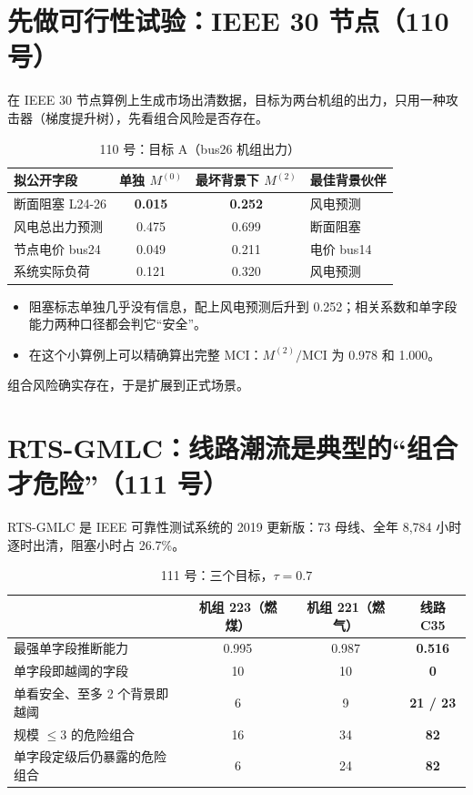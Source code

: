 \documentclass[zihao=-4,a4paper]{ctexart}
\begin{document}
\section{先做可行性试验：IEEE 30 节点（110 号）}

在 IEEE 30 节点算例上生成市场出清数据，目标为两台机组的出力，只用一种攻击器（梯度提升树），先看组合风险是否存在。

\begin{table}[H]\centering
\caption{110 号：目标 A（bus26 机组出力）}
\small
\begin{tabular}{lccl}
\toprule
拟公开字段 & 单独 $M^{(0)}$ & 最坏背景下 $M^{(2)}$ & 最佳背景伙伴 \\
\midrule
断面阻塞 L24-26 & \textbf{0.015} & \textbf{0.252} & 风电预测 \\
风电总出力预测 & 0.475 & 0.699 & 断面阻塞 \\
节点电价 bus24 & 0.049 & 0.211 & 电价 bus14 \\
系统实际负荷 & 0.121 & 0.320 & 风电预测 \\
\bottomrule
\end{tabular}
\end{table}

\begin{itemize}[leftmargin=*]
  \item 阻塞标志单独几乎没有信息，配上风电预测后升到 0.252；相关系数和单字段能力两种口径都会判它“安全”。
  \item 在这个小算例上可以精确算出完整 MCI：$M^{(2)}/\text{MCI}$ 为 0.978 和 1.000。
\end{itemize}

组合风险确实存在，于是扩展到正式场景。

\section{RTS-GMLC：线路潮流是典型的“组合才危险”（111 号）}

RTS-GMLC 是 IEEE 可靠性测试系统的 2019 更新版：73 母线、全年 8,784 小时逐时出清，阻塞小时占 26.7\%。

\begin{table}[H]\centering
\caption{111 号：三个目标，$\tau=0.7$}
\small
\begin{tabular}{lccc}
\toprule
& 机组 223（燃煤） & 机组 221（燃气） & \textbf{线路 C35} \\
\midrule
最强单字段推断能力 & 0.995 & 0.987 & \textbf{0.516} \\
单字段即越阈的字段 & 10 & 10 & \textbf{0} \\
单看安全、至多 2 个背景即越阈 & 6 & 9 & \textbf{21 / 23} \\
规模 $\le3$ 的危险组合 & 16 & 34 & \textbf{82} \\
单字段定级后仍暴露的危险组合 & 6 & 24 & \textbf{82} \\
\bottomrule
\end{tabular}
\end{table}
\end{document}
